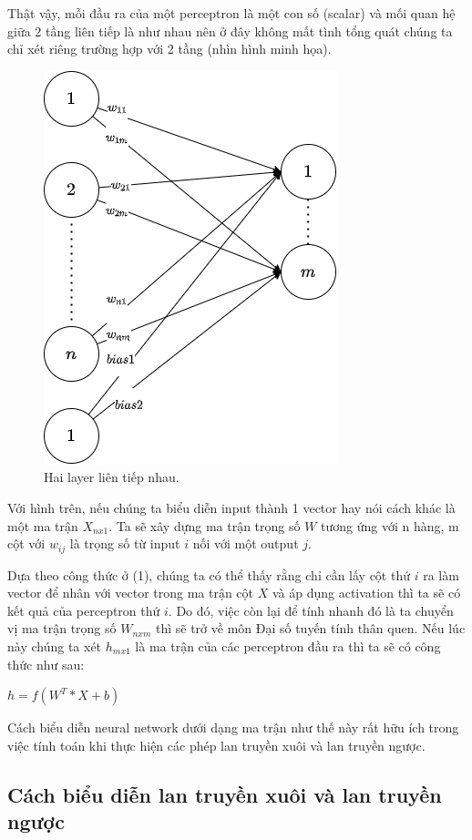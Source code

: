 Thật vậy, mỗi đầu ra của một perceptron là một con số (scalar) và mối quan hệ giữa 2 tầng liên tiếp là như nhau nên ở đây không mất tình tổng quát chúng ta chỉ xét riêng trường hợp với 2 tầng (nhìn hình minh họa).
\begin{figure}[!h]
	\centering
		\includegraphics[width=0.5\columnwidth]{books/artificial-neural-network/chapter03/figure/FC.png}
        \caption{Hai layer liên tiếp nhau.}
        \label{fig:FC}
		\centering
\end{figure}

Với hình trên, nếu chúng ta biểu diễn input thành 1 vector hay nói cách khác là một ma trận $X_{nx1}$. Ta sẽ xây dựng ma trận trọng số $W$ tương ứng với n hàng, m cột với $w_{ij}$ là trọng số từ input $i$ nối với một output $j$.

Dựa theo công thức ở (1), chúng ta có thể thấy rằng chỉ cần lấy cột thứ $i$ ra làm vector để nhân với vector trong ma trận cột $X$ và áp dụng activation thì ta sẽ có kết quả của perceptron thứ $i$. Do đó, việc còn lại để tính nhanh đó là ta chuyển vị ma trận trọng số $W_{nxm}$ thì sẽ trở về môn Đại số tuyến tính thân quen. Nếu lúc này chúng ta xét $h_{mx1}$ là ma trận của các perceptron đầu ra thì ta sẽ có công thức như sau:
\begin{center}
    $h = f(W^{T}*X+b)$
\end{center}

Cách biểu diễn neural network dưới dạng ma trận như thế này rất hữu ích trong việc tính toán khi thực hiện các phép lan truyền xuôi và lan truyền ngược.

\subsection{Cách biểu diễn lan truyền xuôi và lan truyền ngược}
